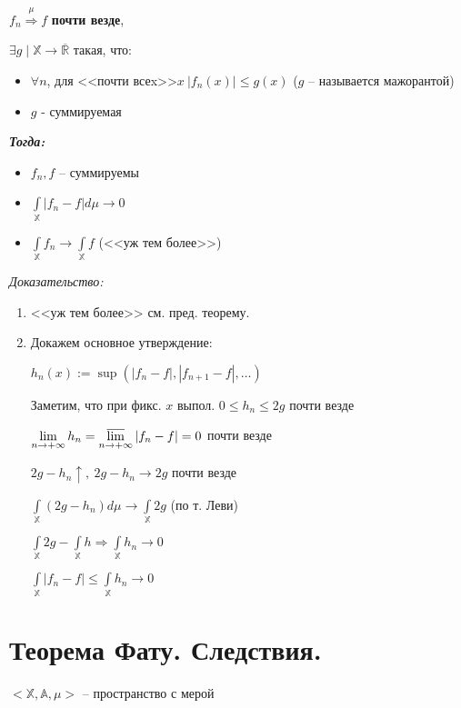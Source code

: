 \documentclass[paper=a4, fontsize=13.2pt]{article}
\begin{document}
$f_n\stackrel{\mu}{\Rightarrow}f$ \textbf{почти везде},

$\exists g \mid \mathds{X} \rightarrow \overline{\mathds{R}}$ такая, что:
\begin{itemize}
\item
$\forall n$,  для <<почти всеx>>$x ~ |f_n(x)| \leq g(x)$ ($g$ -- называется мажорантой)
\item
$g$ - суммируемая
\end{itemize}

\emph{\textbf{Тогда:}}
\begin{itemize}
    \item $f_n, f$ -- суммируемы
    \item $\int\limits_{\mathds{X}} |f_n - f| d\mu \rightarrow 0$
    \item $\int\limits_{\mathds{X}} f_n \rightarrow \int\limits_{\mathds{X}} f$ (<<уж тем более>>)
\end{itemize}

\emph{Доказательство:}

\begin{enumerate}
	\item <<уж тем более>> см. пред. теорему.

	\item Докажем основное утверждение:

	$ h_n(x) := \sup(|f_n - f|, |f_{n+1} - f|, \dots) $

	Заметим, что при фикс. $ x $ выпол. $ 0 \leq h_n \leq 2g $ почти везде

	$ \lim\limits_{n \rightarrow +\infty} h_n =
	\varlimsup\limits_{n \rightarrow +\infty} |f_n - f| = 0 $ почти везде

	$ 2g - h_n \uparrow , ~ 2g - h_n \rightarrow 2g$ почти везде

	$ \int\limits_{\mathds{X}}(2g - h_n) d\mu \rightarrow \int\limits_{\mathds{X}} 2g $
	(по т. Леви)

	$ \int\limits_{\mathds{X}} 2g - \int\limits_{\mathds{X}} h \Rightarrow \int\limits_{\mathds{X}} h_n \rightarrow 0 $

	$ \int\limits_{\mathds{X}} |f_n - f| \leq \int\limits_{\mathds{X}} h_n \rightarrow 0 $
\end{enumerate}

\section{Теорема Фату. Следствия.}
$<\mathbb{X}, \mathbb{A}, \mu>$ -- пространство с мерой
\end{document}
